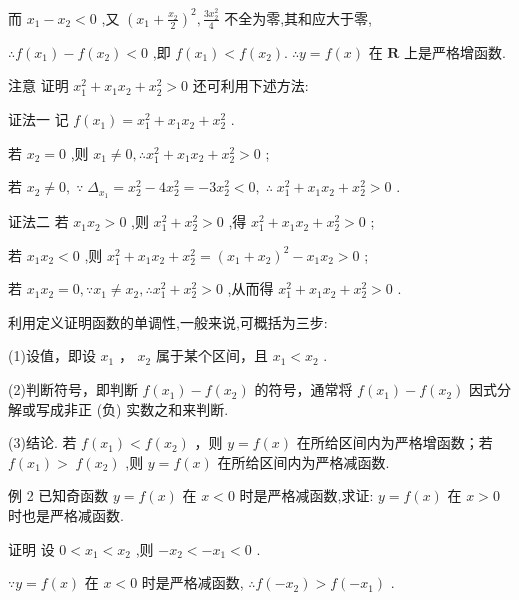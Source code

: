 \documentclass[10pt]{article}
\begin{document}
而 \({x}_{1} - {x}_{2} < 0\) ,又 \({\left( {x}_{1} + \frac{{x}_{2}}{2}\right) }^{2},\frac{3{x}_{2}^{2}}{4}\) 不全为零,其和应大于零,

\(\therefore f\left( {x}_{1}\right)  - f\left( {x}_{2}\right)  < 0\) ,即 \(f\left( {x}_{1}\right)  < f\left( {x}_{2}\right) .\;\therefore y = f\left( x\right)\) 在 \(\mathbf{R}\) 上是严格增函数.

注意 证明 \({x}_{1}^{2} + {x}_{1}{x}_{2} + {x}_{2}^{2} > 0\) 还可利用下述方法:

证法一 记 \(f\left( {x}_{1}\right)  = {x}_{1}^{2} + {x}_{1}{x}_{2} + {x}_{2}^{2}\) .

若 \({x}_{2} = 0\) ,则 \({x}_{1} \neq  0,\therefore {x}_{1}^{2} + {x}_{1}{x}_{2} + {x}_{2}^{2} > 0\) ;

若 \({x}_{2} \neq  0,\;\because \;{\Delta }_{{x}_{1}} = {x}_{2}^{2} - 4{x}_{2}^{2} =  - 3{x}_{2}^{2} < 0,\;\therefore \;{x}_{1}^{2} + {x}_{1}{x}_{2} + {x}_{2}^{2} > 0\) .

证法二 若 \({x}_{1}{x}_{2} > 0\) ,则 \({x}_{1}^{2} + {x}_{2}^{2} > 0\) ,得 \({x}_{1}^{2} + {x}_{1}{x}_{2} + {x}_{2}^{2} > 0\) ;

若 \({x}_{1}{x}_{2} < 0\) ,则 \({x}_{1}^{2} + {x}_{1}{x}_{2} + {x}_{2}^{2} = {\left( {x}_{1} + {x}_{2}\right) }^{2} - {x}_{1}{x}_{2} > 0\) ;

若 \({x}_{1}{x}_{2} = 0,\because {x}_{1} \neq  {x}_{2},\therefore {x}_{1}^{2} + {x}_{2}^{2} > 0\) ,从而得 \({x}_{1}^{2} + {x}_{1}{x}_{2} + {x}_{2}^{2} > 0\) .

利用定义证明函数的单调性,一般来说,可概括为三步:

(1)设值，即设 \({x}_{1}\) ， \({x}_{2}\) 属于某个区间，且 \({x}_{1} < {x}_{2}\) .

(2)判断符号，即判断 \(f\left( {x}_{1}\right)  - f\left( {x}_{2}\right)\) 的符号，通常将 \(f\left( {x}_{1}\right)  - f\left( {x}_{2}\right)\) 因式分解或写成非正 (负) 实数之和来判断.

(3)结论. 若 \(f\left( {x}_{1}\right)  < f\left( {x}_{2}\right)\) ，则 \(y = f\left( x\right)\) 在所给区间内为严格增函数；若 \(f\left( {x}_{1}\right)  > \; f\left( {x}_{2}\right)\) ,则 \(y = f\left( x\right)\) 在所给区间内为严格减函数.

例 2 已知奇函数 \(y = f\left( x\right)\) 在 \(x < 0\) 时是严格减函数,求证: \(y = f\left( x\right)\) 在 \(x > 0\) 时也是严格减函数.

证明 设 \(0 < {x}_{1} < {x}_{2}\) ,则 \(- {x}_{2} <  - {x}_{1} < 0\) .

\(\because y = f\left( x\right)\) 在 \(x < 0\) 时是严格减函数, \(\therefore f\left( {-{x}_{2}}\right)  > f\left( {-{x}_{1}}\right)\) .
\end{document}
